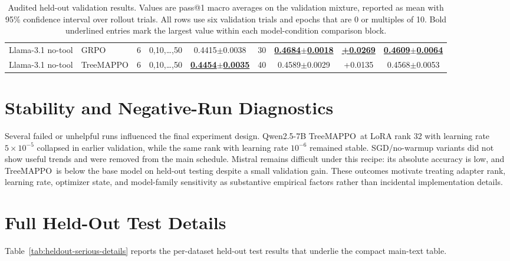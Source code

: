 \documentclass{article}
\newcommand{\ours}{TreeMAPPO\xspace}
\newcommand{\best}[1]{\textbf{\underline{#1}}}
\newcommand{\acc}[2]{#1{\scriptsize$\pm$#2}}
\begin{document}
\begin{table}[t]
{\begin{tabular}{llccccccc}
\hline
Llama-3.1 no-tool & GRPO & 6 & 0,10,\ldots,50 & \acc{0.4415}{0.0038} & 30 & \best{\acc{0.4684}{0.0018}} & \best{+0.0269} & \best{\acc{0.4609}{0.0064}} \\
Llama-3.1 no-tool & \ours & 6 & 0,10,\ldots,50 & \best{\acc{0.4454}{0.0035}} & 40 & \acc{0.4589}{0.0029} & +0.0135 & \acc{0.4568}{0.0053} \\
\hline
\end{tabular}%
}
\caption{Audited held-out validation results. Values are pass@1 macro averages on the validation mixture, reported as mean with 95\% confidence interval over rollout trials. All rows use six validation trials and epochs that are 0 or multiples of 10. Bold underlined entries mark the largest value within each model-condition comparison block.}
\label{tab:validation-results}
\end{table}

\section{Stability and Negative-Run Diagnostics}
\label{app:stability-diagnostics}
Several failed or unhelpful runs influenced the final experiment design. Qwen2.5-7B \ours\ at LoRA rank 32 with learning rate $5\times10^{-5}$ collapsed in earlier validation, while the same rank with learning rate $10^{-6}$ remained stable. SGD/no-warmup variants did not show useful trends and were removed from the main schedule. Mistral remains difficult under this recipe: its absolute accuracy is low, and \ours\ is below the base model on held-out testing despite a small validation gain. These outcomes motivate treating adapter rank, learning rate, optimizer state, and model-family sensitivity as substantive empirical factors rather than incidental implementation details.

\section{Full Held-Out Test Details}
\label{app:heldout-test-details}
Table~\ref{tab:heldout-serious-details} reports the per-dataset held-out test results that underlie the compact main-text table.
\end{document}
